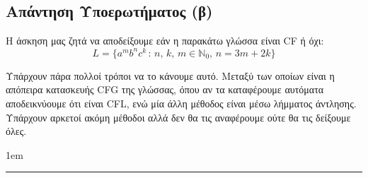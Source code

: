 \subsection{Απάντηση Υποερωτήματος (β)}
\label{ssec:Solution_3.2}
\doublespacing

Η άσκηση μας ζητά να αποδείξουμε εάν η παρακάτω γλώσσα είναι CF ή όχι:
\[L = \{a^mb^nc^k\,:\,n,\,k,\,m\in\mathbb{N}_0,\, n=3m+2k\}\]

\par
Υπάρχουν πάρα πολλοί τρόποι να το κάνουμε αυτό. Μεταξύ των οποίων είναι η απόπειρα κατασκευής CFG της γλώσσας, όπου
αν τα καταφέρουμε αυτόματα αποδεικνύουμε ότι είναι CFL, ενώ μία άλλη μέθοδος είναι μέσω λήμματος άντλησης. Υπάρχουν
αρκετοί ακόμη μέθοδοι αλλά δεν θα τις αναφέρουμε ούτε θα τις δείξουμε όλες.

\begin{tcolorbox}[colback=yellow!15!white, colframe=blue!50!white,
	fonttitle=\bfseries\Large, title = Απόδειξη - μέρος 1/3]
	\begin{itemize}
		\itemsep1em




	\end{itemize}
\end{tcolorbox}


\begin{center}
	\noindent\rule{\linewidth}{0.5pt}
\end{center}
\clearpage
